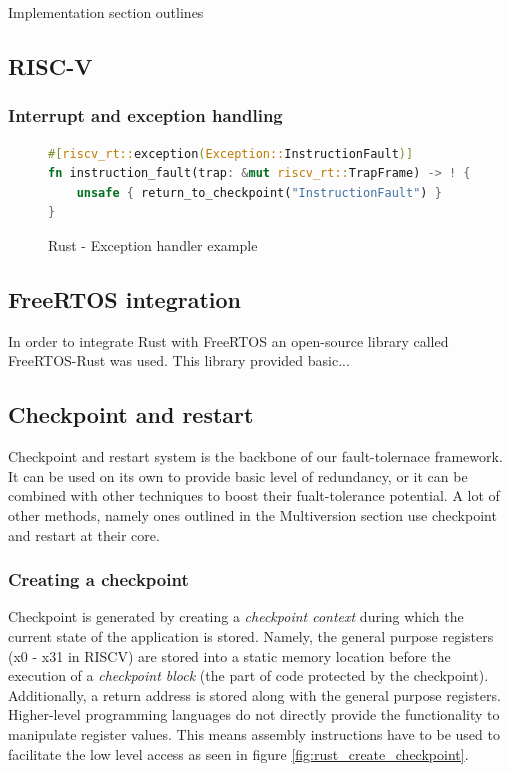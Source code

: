 \documentclass[12pt, letterpaper]{article}
\begin{document}
Implementation section outlines 

\subsection{RISC-V}

\subsubsection{Interrupt and exception handling} \label{sec:riscv_exception_handling}

\begin{figure}
\begin{lstlisting}[language=Rust]
#[riscv_rt::exception(Exception::InstructionFault)]
fn instruction_fault(trap: &mut riscv_rt::TrapFrame) -> ! {
    unsafe { return_to_checkpoint("InstructionFault") }
}
\end{lstlisting}
\caption{Rust - Exception handler example}
\label{fig:rust_exception_handler}
\end{figure}

\subsection{FreeRTOS integration}

In order to integrate Rust with FreeRTOS an open-source library called FreeRTOS-Rust was used. This library provided basic... 

\clearpage

\subsection{Checkpoint and restart}

Checkpoint and restart system is the backbone of our fault-tolernace framework. It can be used on its own to provide basic level of redundancy, or it can be combined with other techniques to boost their fualt-tolerance potential. A lot of other methods, namely ones outlined in the Multiversion section use checkpoint and restart at their core.

\subsubsection{Creating a checkpoint} \label{sec:creating_checkpoint}

Checkpoint is generated by creating a \textit{checkpoint context} during which the current state of the application is stored. Namely, the general purpose registers (x0 - x31 in RISCV) are stored into a static memory location before the execution of a \textit{checkpoint block} (the part of code protected by the checkpoint). Additionally, a return address is stored along with the general purpose registers. Higher-level programming languages do not directly provide the functionality to manipulate register values. This means assembly instructions have to be used to facilitate the low level access as seen in figure \ref{fig:rust_create_checkpoint}.
\end{document}
